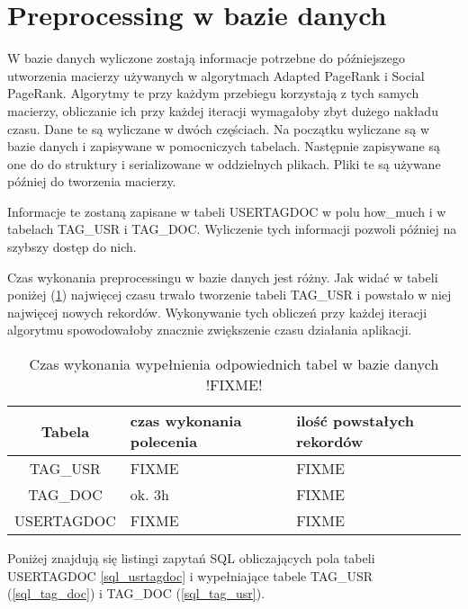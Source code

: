 



\section{Preprocessing w bazie danych}

W bazie danych wyliczone zostają informacje potrzebne do późniejszego utworzenia macierzy używanych w algorytmach Adapted PageRank i Social PageRank. Algorytmy te przy każdym przebiegu korzystają z tych samych macierzy, obliczanie ich przy każdej iteracji wymagałoby zbyt dużego nakładu czasu. Dane te są wyliczane w dwóch częściach. Na początku wyliczane są w bazie danych i zapisywane w pomocniczych tabelach. Następnie zapisywane są one do do struktury i serializowane w oddzielnych plikach. Pliki te są używane później do tworzenia macierzy.

Informacje te zostaną zapisane w tabeli USERTAGDOC w polu how\_much i w tabelach TAG\_USR i TAG\_DOC. Wyliczenie tych informacji pozwoli później na szybszy dostęp do nich.

Czas wykonania preprocessingu w bazie danych jest różny. Jak widać w tabeli poniżej (\ref{tab:czas_tabele}) najwięcej czasu trwało tworzenie tabeli TAG\_USR i powstało w niej najwięcej nowych rekordów. Wykonywanie tych obliczeń przy każdej iteracji algorytmu spowodowałoby znacznie zwiększenie czasu działania aplikacji.

\begin{table}[hbp]
  \centering
    \begin{tabular}{ | c | p{3cm}| p{3cm} | }
    \hline
    Tabela & czas wykonania polecenia & ilość powstałych rekordów  \\ 
    \hline
    TAG\_USR & FIXME & FIXME   \\ 
    \hline
    TAG\_DOC & ok. 3h &  FIXME  \\ 
    \hline
    USERTAGDOC & FIXME  & FIXME  \\ 
    \hline
    \end{tabular}
     \caption{Czas wykonania wypełnienia odpowiednich tabel w bazie danych !FIXME!}
    \label{tab:czas_tabele}
   
\end{table}


Poniżej znajdują się listingi zapytań SQL obliczających pola tabeli USERTAGDOC \ref{sql_usrtagdoc} i wypełniające tabele TAG\_USR (\ref{sql_tag_doc}) i TAG\_DOC (\ref{sql_tag_usr}). 


